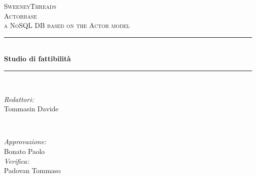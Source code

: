 \documentclass[a4paper]{article}
\begin{document}
	
	\begin{titlepage}
		\newcommand{\HRule}{\rule{\linewidth}{0.5mm}} 
		\center  
		
		\textsc{\LARGE SweeneyThreads}\\[1.5cm] 
		\textsc{\Large Actorbase}\\[0.5cm] 
		\textsc{\large a NoSQL DB based on the Actor model}\\[0.5cm]
		
		
		\HRule \\[0.4cm]
		{ \huge \bfseries Studio di fattibilità}\\[0.4cm] 
		\HRule \\[1.5cm]
		
		\begin{minipage}{0.4\textwidth}
			\begin{flushleft} \large
				\emph{Redattori:}\\
				Tommasin Davide\\
			\end{flushleft}
		\end{minipage}
		~
		\begin{minipage}{0.4\textwidth}
			\begin{flushright} \large
				\emph{Approvazione:} \\
                Bonato Paolo \\
				\emph{Verifica:} \\
                Padovan Tommaso \\
			\end{flushright}
		\end{minipage}
		

\end{titlepage}
\end{document}
